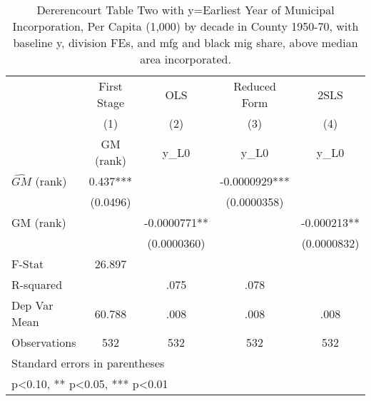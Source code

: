 \begin{table}[htbp]\centering
\def\sym#1{\ifmmode^{#1}\else\(^{#1}\)\fi}
\caption{Dererencourt Table Two with y=Earliest Year of Municipal Incorporation, Per Capita (1,000) by decade in County 1950-70, with baseline y, division FEs, and mfg and black mig share, above median area incorporated.}
\begin{tabular}{l*{4}{c}}
\toprule
                    & First Stage   &         OLS   &Reduced Form   &        2SLS   \\
                    &\multicolumn{1}{c}{(1)}&\multicolumn{1}{c}{(2)}&\multicolumn{1}{c}{(3)}&\multicolumn{1}{c}{(4)}\\
                    &\multicolumn{1}{c}{GM  (rank)}&\multicolumn{1}{c}{y\_L0}&\multicolumn{1}{c}{y\_L0}&\multicolumn{1}{c}{y\_L0}\\
\midrule
$\hat{GM}$ (rank)   &       0.437***&               &  -0.0000929***&               \\
                    &    (0.0496)   &               & (0.0000358)   &               \\
\addlinespace
GM  (rank)          &               &  -0.0000771** &               &   -0.000213** \\
                    &               & (0.0000360)   &               & (0.0000832)   \\
\midrule
F-Stat              &      26.897   &               &               &               \\
R-squared           &               &        .075   &        .078   &               \\
Dep Var Mean        &      60.788   &        .008   &        .008   &        .008   \\
Observations        &         532   &         532   &         532   &         532   \\
\bottomrule
\multicolumn{5}{l}{\footnotesize Standard errors in parentheses}\\
\multicolumn{5}{l}{\footnotesize * p<0.10, ** p<0.05, *** p<0.01}\\
\end{tabular}
\end{table}
